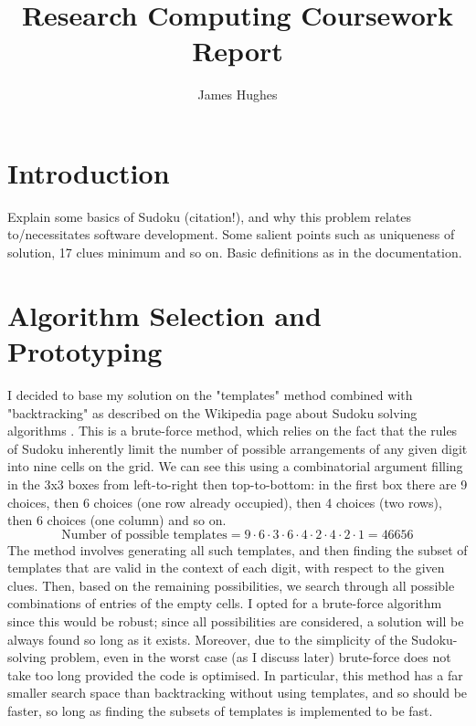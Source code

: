 \documentclass[12pt]{article}
\title{Research Computing Coursework Report}
\author{James Hughes}
\begin{document}
\maketitle
\newpage


\section*{Introduction}
Explain some basics of Sudoku (citation!), and why this problem relates to/necessitates software development.
Some salient points such as uniqueness of solution, 17 clues minimum \cite{wiki2} and so on.
Basic definitions as in the documentation.

\section*{Algorithm Selection and Prototyping}
I decided to base my solution on the "templates" method combined with "backtracking" as described on the Wikipedia page about Sudoku solving algorithms \cite{wiki1}.
This is a brute-force method, which relies on the fact that the rules of Sudoku inherently limit the number of possible arrangements of any given digit into nine cells on the grid.
We can see this using a combinatorial argument filling in the 3x3 boxes from left-to-right then top-to-bottom: in the first box there are 9 choices, then 6 choices (one row already occupied), then 4 choices (two rows), then 6 choices (one column) and so on.
\[
    \text{Number of possible templates} = 9\cdot6\cdot3\cdot6\cdot4\cdot2\cdot4\cdot2\cdot1 = 46656
\]
The method involves generating all such templates, and then finding the subset of templates that are valid in the context of each digit, with respect to the given clues.
Then, based on the remaining possibilities, we search through all possible combinations of entries of the empty cells.
I opted for a brute-force algorithm since this would be robust; since all possibilities are considered, a solution will be always found so long as it exists.
Moreover, due to the simplicity of the Sudoku-solving problem, even in the worst case (as I discuss later) brute-force does not take too long provided the code is optimised.
In particular, this method has a far smaller search space than backtracking without using templates, and so should be faster, so long as finding the subsets of templates is implemented to be fast.
\end{document}
